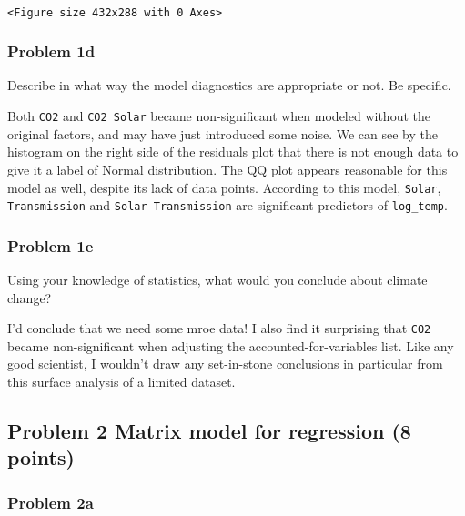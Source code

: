\documentclass[11pt]{article}
\begin{document}
    \begin{center}
    \end{center}
    { \hspace*{\fill} \\}
    
    
    \begin{verbatim}
<Figure size 432x288 with 0 Axes>
    \end{verbatim}

    
    \subsubsection{Problem 1d}\label{problem-1d}

Describe in what way the model diagnostics are appropriate or not. Be
specific.

    Both \texttt{CO2} and \texttt{CO2\ Solar} became non-significant when
modeled without the original factors, and may have just introduced some
noise. We can see by the histogram on the right side of the residuals
plot that there is not enough data to give it a label of Normal
distribution. The QQ plot appears reasonable for this model as well,
despite its lack of data points. According to this model,
\texttt{Solar}, \texttt{Transmission} and \texttt{Solar\ Transmission}
are significant predictors of \texttt{log\_temp}.

    \subsubsection{Problem 1e}\label{problem-1e}

Using your knowledge of statistics, what would you conclude about
climate change?

    I'd conclude that we need some mroe data! I also find it surprising that
\texttt{CO2} became non-significant when adjusting the
accounted-for-variables list. Like any good scientist, I wouldn't draw
any set-in-stone conclusions in particular from this surface analysis of
a limited dataset.

    \subsection{Problem 2 Matrix model for regression (8
points)}\label{problem-2-matrix-model-for-regression-8-points}

\subsubsection{Problem 2a}\label{problem-2a}
\end{document}
